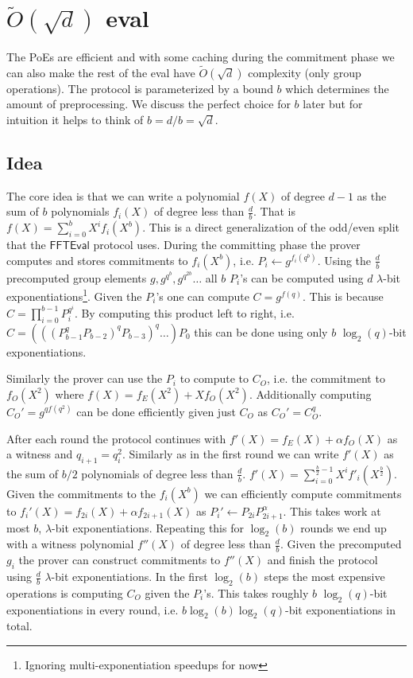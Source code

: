 \documentclass[12pt]{article}
\theoremstyle{Definition}
\begin{document}
\section{$\tilde{O}(\sqrt{d})$ eval}
The PoEs are efficient and with some caching during the commitment phase we can also make the rest of the eval have $\tilde{O}(\sqrt{d})$ complexity (only group operations). The protocol is parameterized by a bound $b$ which determines the amount of preprocessing. We discuss the perfect choice for $b$ later but for intuition it helps to think of $b=d/b=\sqrt{d}$.
\subsection{Idea}
The core idea is that we can write a polynomial $f(X)$ of degree $d-1$ as the sum of $b$ polynomials $f_i(X)$ of degree less than $\frac{d}{b}$. That is $f(X)=\sum_{i=0}^b X^i f_i(X^b)$. This is a direct generalization of the odd/even split that the $\textsf{FFTEval}$ protocol uses. During the committing phase the prover computes and stores commitments to $f_i(X^b)$, i.e. $P_i\gets g^{f_i(q^b)}$. Using the $\frac{d}{b}$ precomputed group elements $g,g^{q^b},g^{q^{2b}}\dots$ all $b$ $P_i$'s can be computed using $d$ $\lambda$-bit exponentiations\footnote{Ignoring multi-exponentiation speedups for now}. Given the $P_i$'s one can compute $C=g^{f(q)}$. This is because $C=\prod_{i=0}^{b-1} P_i^{q^i}$. By computing this product left to right, i.e. $C=(((P_{b-1}^qP_{b-2})^qP_{b-3})^q \dots)P_0$ this can be done using only $b$ $\log_2(q)$-bit exponentiations.

Similarly the prover can use the $P_i$ to compute to $C_O$, i.e. the commitment to $f_O(X^2)$ where $f(X)=f_E(X^2)+Xf_O(X^2)$. Additionally computing $C_O'=g^{q f(q^2)}$ can be done efficiently given just $C_O$ as $C_O'=C_O^q$. 

After each round the protocol continues with $f'(X)=f_E(X)+\alpha f_O(X)$ as a witness and $q_{i+1}=q_{i}^2$. Similarly as in the first round we can write $f'(X)$ as the sum of $b/2$ polynomials of degree less than $\frac{d}{b}$.
$f'(X)=\sum_{i=0}^{\frac{b}{2}-1} X^i f'_i(X^{\frac{b}{2}})$. Given the commitments to the $f_i(X^b)$ we can efficiently compute commitments to $f_i'(X)=f_{2i}(X)+\alpha f_{2i+1}(X)$ as $P_i'\gets P_{2i}P_{2i+1}^{\alpha}$. This takes work at most $b$, $\lambda$-bit exponentiations. Repeating this for $\log_2(b)$ rounds we end up with a witness polynomial $f''(X)$ of degree less than $\frac{d}{b}$. Given the precomputed $g_i$ the prover can construct commitments to $f''(X)$ and finish the protocol using $\frac{d}{b}$ $\lambda$-bit exponentiations. In the first $\log_2(b)$ steps the most expensive operations is computing $C_O$ given the $P_i$'s. This takes roughly $b$ $\log_2(q)$-bit exponentiations in every round, i.e. $b\log_2(b) \log_2(q)$-bit exponentiations in total.
\end{document}
